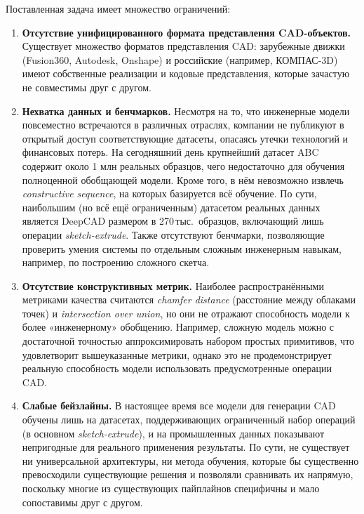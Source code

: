 Поставленная задача имеет множество ограничений:
\begin{enumerate}
	\item \textbf{Отсутствие унифицированного формата представления CAD-объектов.}
	      Существует множество форматов представления CAD: зарубежные движки (Fusion360, Autodesk, Onshape) и российские (например, КОМПАС-3D) имеют собственные реализации и кодовые представления, которые зачастую не совместимы друг с другом.

	\item \textbf{Нехватка данных и бенчмарков.}
	      Несмотря на то, что инженерные модели повсеместно встречаются в различных отраслях, компании не публикуют в открытый доступ соответствующие датасеты, опасаясь утечки технологий и финансовых потерь.
	      На сегодняшний день крупнейший датасет ABC содержит около 1 млн реальных образцов, чего недостаточно для обучения полноценной обобщающей модели.
	      Кроме того, в нём невозможно извлечь \textit{constructive sequence}, на которых базируется всё обучение.
	      По сути, наибольшим (но всё ещё ограниченным) датасетом реальных данных является DeepCAD размером в 270\,тыс.\ образцов, включающий лишь операции \textit{sketch-extrude}.
	      Также отсутствуют бенчмарки, позволяющие проверить умения системы по отдельным сложным инженерным навыкам, например, по построению сложного скетча.

	\item \textbf{Отсутствие конструктивных метрик.}
	      Наиболее распространёнными метриками качества считаются \textit{chamfer distance} (расстояние между облаками точек) и \textit{intersection over union}, но они не отражают способность модели к более «инженерному» обобщению.
	      Например, сложную модель можно с достаточной точностью аппроксимировать набором простых примитивов, что удовлетворит вышеуказанные метрики, однако это не продемонстрирует реальную способность модели использовать предусмотренные операции CAD.

	\item \textbf{Слабые бейзлайны.}
	      В настоящее время все модели для генерации CAD обучены лишь на датасетах, поддерживающих ограниченный набор операций (в основном \textit{sketch-extrude}), и на промышленных данных показывают непригодные для реального применения результаты.
	      По сути, не существует ни универсальной архитектуры, ни метода обучения, которые бы существенно превосходили существующие решения и позволяли сравнивать их напрямую, поскольку многие из существующих пайплайнов специфичны и мало сопоставимы друг с другом.
\end{enumerate}

